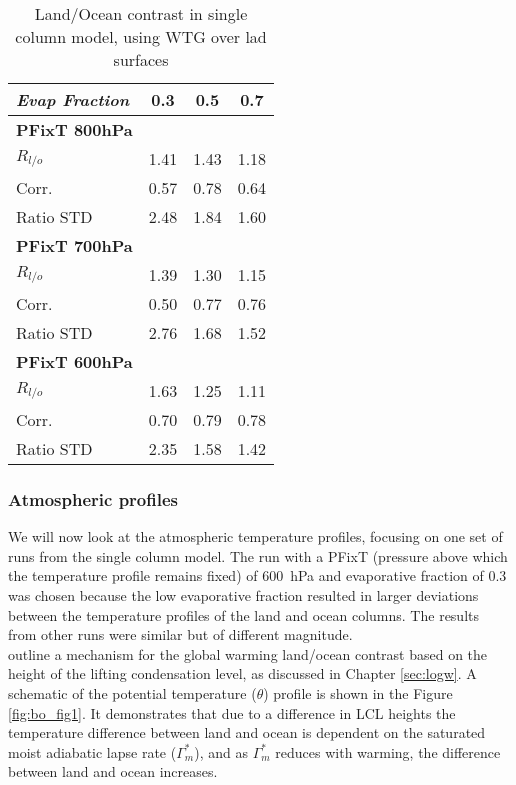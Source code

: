 \begin{center}
	\begin{table}[ht]
		\caption{Land/Ocean contrast in single column model, using WTG over lad 
		surfaces}
		\label{tab:scmrlo}
		\scriptsize
	\begin{tabular}{ l  c  c  c }
		\textit{Evap Fraction}		& 0.3   & 0.5  & 0.7 \\ \hline
		\textbf{PFixT 800hPa}\\%
		$R_{l/o}$  							& 1.41  & 1.43 & 1.18\\ %
	Corr.							& 0.57  & 0.78 & 0.64\\ %
	Ratio STD           			& 2.48  & 1.84 & 1.60\\ \hline
		\textbf{PFixT 700hPa}\\%
		$R_{l/o}$  							& 1.39  & 1.30 & 1.15\\ %
	Corr.							& 0.50  & 0.77 & 0.76\\ %
	Ratio STD           			& 2.76  & 1.68 & 1.52\\ \hline
		\textbf{PFixT 600hPa}\\%
		$R_{l/o}$  							& 1.63  & 1.25 & 1.11\\ %
	Corr.							& 0.70  & 0.79 & 0.78\\ %
	Ratio STD           			& 2.35  & 1.58 & 1.42\\ \hline
	\end{tabular}
	\end{table}
\end{center}


\subsubsection{Atmospheric profiles}
We will now look at the atmospheric temperature profiles, focusing on one set of 
runs from the single column model. The run with a PFixT (pressure above which 
the temperature profile remains fixed) of \SI{600}{\hecto\pascal} and 
evaporative fraction of 0.3 was chosen because the low evaporative fraction 
resulted in larger deviations between the temperature profiles of the land and 
ocean columns. The results from other runs were similar but of different 
magnitude. \\
\citet{Byrne2013a} outline a mechanism for the global warming land/ocean 
contrast based on the height of the lifting condensation level, as discussed in 
Chapter \ref{sec:logw}. A schematic of the potential temperature ($\theta$) 
profile is shown in the Figure \ref{fig:bo_fig1}. It demonstrates that due to a 
difference in LCL heights the temperature difference between land and ocean is 
dependent on the saturated moist adiabatic lapse rate ($\Gamma_m^*$), and as 
$\Gamma_m^*$ reduces with warming, the difference between land and ocean 
increases.

